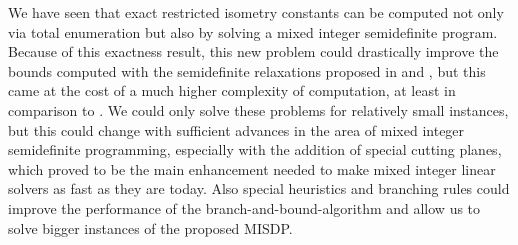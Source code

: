 \documentclass[journal]{IEEEtran}
\begin{document}
We have seen that exact restricted isometry constants can be computed not only via total enumeration but also by solving a mixed integer semidefinite program. Because of this exactness result, this new problem could drastically
improve the bounds computed with the semidefinite relaxations proposed in \cite{Asp07} and \cite{Asp08}, but this came at the cost of a much higher complexity of computation, at least in comparison to \cite{Asp07}. We could only 
solve these problems for relatively small instances, but this could change with sufficient advances in the area of mixed integer semidefinite programming, especially with the addition of special cutting planes, which proved to be 
the main enhancement needed to make mixed integer linear solvers as fast as they are today. Also special heuristics and branching rules could improve the performance of the branch-and-bound-algorithm and allow us to solve bigger 
instances of the proposed MISDP.



\end{document}
